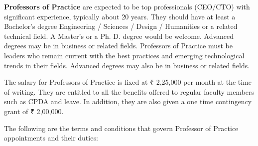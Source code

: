 \documentclass[
  10pt,
  a5paper,
  10pt,
  openany]{amsbook}
\begin{document}
\textbf{Professors of Practice} are expected to be top professionals
(CEO/CTO) with significant experience, typically about 20 years. They
should have at least a Bachelor's degree Engineering / Sciences / Design
/ Humanities or a related technical field. A Master's or a Ph. D. degree
would be welcome. Advanced degrees may be in business or related fields.
Professors of Practice must be leaders who remain current with the best
practices and emerging technological trends in their fields. Advanced
degrees may also be in business or related fields.

The salary for Professors of Practice is fixed at ₹ 2,25,000 per month
at the time of writing. They are entitled to all the benefits offered to
regular faculty members such as CPDA and leave. In addition, they are
also given a one time contingency grant of ₹ 2,00,000.

The following are the terms and conditions that govern Professor of
Practice appointments and their duties:
\end{document}
